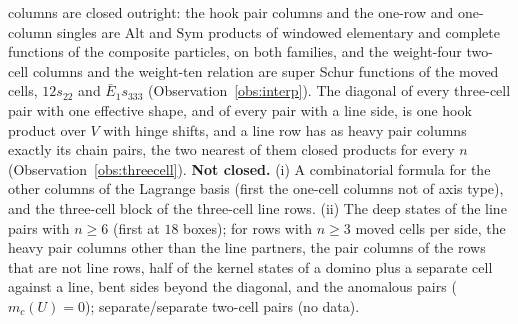 \documentclass[11pt]{article}
\begin{document}
\begin{itemize}
columns are closed outright: the hook pair columns and the one-row and one-column singles are $\mathrm{Alt}$ and
$\mathrm{Sym}$ products of windowed elementary and complete functions of the composite particles, on both families, and
the weight-four two-cell columns and the weight-ten relation are super Schur functions of the moved cells, $12s_{22}$
and $\bar E_1s_{333}$ (Observation~\ref{obs:interp}).  The
diagonal of every three-cell pair with one effective shape, and of every pair with a line side, is one hook product over
$V$ with hinge shifts, and a line row has as heavy pair columns exactly its chain pairs, the two nearest of them closed
products for every $n$ (Observation~\ref{obs:threecell}).
\textbf{Not closed.}  (i) A combinatorial formula for the other columns of the Lagrange basis (first the one-cell
columns not of axis type), and the three-cell block of the three-cell line rows.  (ii) The deep states of the line pairs with $n\ge6$ (first at $18$ boxes); for rows with $n\ge3$ moved cells per
side, the heavy pair columns other than the line partners, the pair columns of the rows that are not line rows, half of
the kernel states of a domino plus a separate cell against a line, bent sides beyond the diagonal, and the anomalous
pairs ($m_c(U)=0$); separate/separate two-cell pairs (no data).


\end{itemize}
\end{document}
